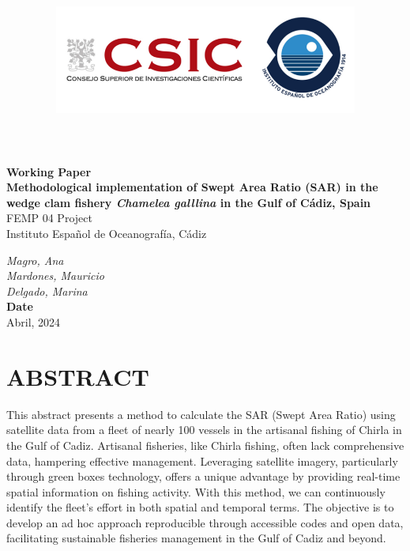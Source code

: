 \documentclass[
]{article}
\title{\includegraphics[width=10cm,height=\textheight]{IEO-logo2.png}}
\author{}
\date{\vspace{-2.5em}}
\begin{document}
\maketitle



\begin{flushleft}
\Large{\textbf{Working Paper}}\\
\vspace*{2\baselineskip}
\LARGE{\textbf{Methodological implementation of Swept Area Ratio (SAR) in the wedge clam fishery \textit{Chamelea galllina} in the Gulf of Cádiz, Spain}}\\
\vspace*{5\baselineskip}
\Large{FEMP 04 Project}\\
\vspace*{1\baselineskip}
\Large{Instituto Español de Oceanografía, Cádiz }\\
\vspace*{4\baselineskip}
\end{flushleft}
\begin{flushright}
\large{\textit{Magro, Ana}}\\
\large{\textit{Mardones, Mauricio}}\\
\large{\textit{Delgado, Marina}}\\
\vspace*{1\baselineskip}
\normalsize{\textbf{Date}}\\
Abril, 2024
\end{flushright}



\hypersetup{linkcolor = black}
\newpage
{}

\newpage



\hypersetup{linkcolor = blue}

{
\hypersetup{linkcolor=}
\setcounter{tocdepth}{3}
\tableofcontents
}
\newpage

\hypertarget{abstract}{%
\section{ABSTRACT}\label{abstract}}

This abstract presents a method to calculate the SAR (Swept Area Ratio) using satellite data from a fleet of nearly 100 vessels in the artisanal fishing of Chirla in the Gulf of Cadiz. Artisanal fisheries, like Chirla fishing, often lack comprehensive data, hampering effective management. Leveraging satellite imagery, particularly through green boxes technology, offers a unique advantage by providing real-time spatial information on fishing activity. With this method, we can continuously identify the fleet's effort in both spatial and temporal terms. The objective is to develop an ad hoc approach reproducible through accessible codes and open data, facilitating sustainable fisheries management in the Gulf of Cadiz and beyond.
\end{document}

